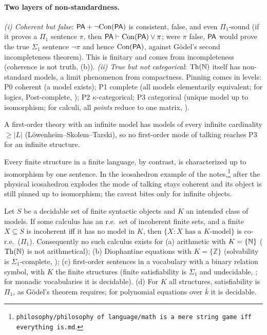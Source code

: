 \paragraph{Two layers of non-standardness.} \emph{(i) Coherent but false}: $\mathsf{PA}+\neg\mathrm{Con}(\mathsf{PA})$ is consistent, false, and even $\Pi_1$-sound (if it proves a $\Pi_1$ sentence $\pi$, then $\mathsf{PA}\vdash\mathrm{Con}(\mathsf{PA})\vee\pi$; were $\pi$ false, $\mathsf{PA}$ would prove the true $\Sigma_1$ sentence $\neg\pi$ and hence $\mathrm{Con}(\mathsf{PA})$, against G\"odel's second incompleteness theorem). This is finitary and comes from incompleteness (coherence is not truth, (b)). \emph{(ii) True but not categorical}: $\mathrm{Th}(\mathbb{N})$ itself has non-standard models, a limit phenomenon from compactness. Pinning comes in levels: P0 coherent (a model exists); P1 complete (all models elementarily equivalent; for logics, Post-complete, ); P2 $\kappa$-categorical; P3 categorical (unique model up to isomorphism; for calculi, all \emph{points} reduce to one matrix, ).

\begin{theorem}\label{thm:existence:compactness}
A first-order theory with an infinite model has models of every infinite cardinality $\ge|L|$ (L\"owenheim--Skolem--Tarski), so no first-order mode of talking reaches P3 for an infinite structure.
\end{theorem}

Every finite structure in a finite language, by contrast, is characterized up to isomorphism by one sentence. In the icosahedron example of the notes,\footnote{\texttt{philosophy/philosophy of language/math is a mere string game iff everything is.md}.} after the physical icosahedron explodes the mode of talking stays coherent and its object is still pinned up to isomorphism; the caveat bites only for infinite objects.

\begin{theorem}\label{thm:existence:computability}
Let $S$ be a decidable set of finite syntactic objects and $K$ an intended class of models. If some calculus has an r.e.\ set of incoherent finite sets, and a finite $X\subseteq S$ is incoherent iff it has no model in $K$, then $\{X:X\text{ has a }K\text{-model}\}$ is co-r.e.\ ($\Pi_1$). Consequently no such calculus exists for \textup{(a)} arithmetic with $K=\{\mathbb{N}\}$ ($\mathrm{Th}(\mathbb{N})$ is not arithmetical); \textup{(b)} Diophantine equations with $K=\{\mathbb Z\}$ (solvability is $\Sigma_1$-complete, \citealt{matiyasevich1970enumerable}); \textup{(c)} first-order sentences in a vocabulary with a binary relation symbol, with $K$ the finite structures (finite satisfiability is $\Sigma_1$ and undecidable, \citealt{trakhtenbrot1950impossibility}; for monadic vocabularies it is decidable). \textup{(d)} For $K$ all structures, satisfiability is $\Pi_1$, as G\"odel's theorem requires; for polynomial equations over $\bar k$ it is decidable.
\end{theorem}

